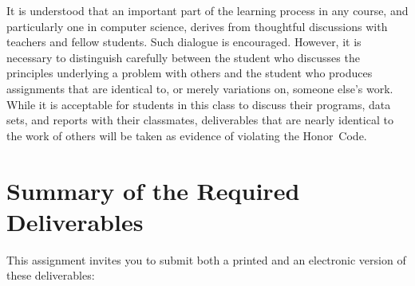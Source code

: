 \noindent It is understood that an important part of the learning process in any course, and particularly one in
computer science, derives from thoughtful discussions with teachers and fellow students.  Such dialogue is encouraged.
However, it is necessary to distinguish carefully between the student who discusses the principles underlying a problem
with others and the student who produces assignments that are identical to, or merely variations on, someone else's
work.  While it is acceptable for students in this class to discuss their programs, data sets, and reports with their
classmates, deliverables that are nearly identical to the work of others will be taken as evidence of violating the
\mbox{Honor Code}.

\section*{Summary of the Required Deliverables}

This assignment invites you to submit both a printed and an electronic version of these deliverables:

